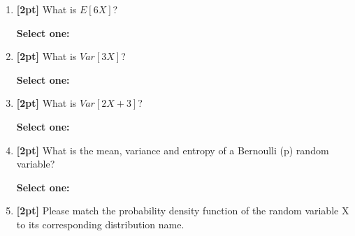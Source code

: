 \documentclass[12pt]{article}
\renewcommand{\circle}{\tikz\draw[black] (0,0) circle (1ex);}
\begin{document}
\begin{enumerate}
    \item \textbf{[2pt]} What is $E[6X]$?

    \textbf{Select one:}


    \item \textbf{[2pt]} What is $Var[3X]$?

    \textbf{Select one:}


    \item \textbf{[2pt]} What is $Var[2X + 3]$?

    \textbf{Select one:}

\clearpage
    \item \textbf{[2pt]} What is the mean, variance and entropy of a Bernoulli (p) random variable?
    
    \textbf{Select one:}
    

    \item \textbf{[2pt]} Please match the probability density function of the random variable X to its corresponding distribution name.
    

\end{enumerate}
\end{document}
